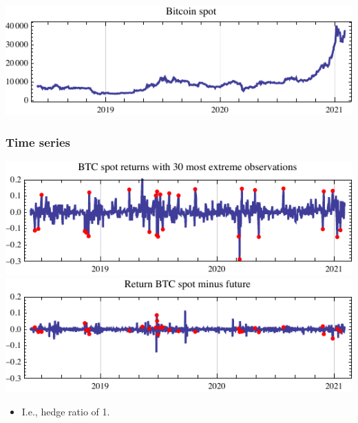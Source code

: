 \documentclass[10pt,mathserif]{beamer}
\renewcommand{\(}{\begin{columns}}
\renewcommand{\)}{\end{columns}}
\newcommand{\<}[1]{\begin{column}{#1}}
\renewcommand{\>}{\end{column}}
\theoremstyle{definition}
\begin{document}
\begin{frame}
  \begin{center}
    \includegraphics[scale=1]{../_pics/btc_level_series.pdf}\\[10pt]
  \end{center}
\end{frame}


\begin{frame}
  \frametitle{Time series}
  \begin{center}
        \includegraphics[scale=1]{../_pics/btc_series.pdf}\\[10pt]
    \includegraphics[scale=1]{../_pics/btc_vs_future_series.pdf}    
  \end{center}
  \begin{itemize}
  \item I.e., hedge ratio of 1.
  \end{itemize}
\end{frame}
\end{document}
